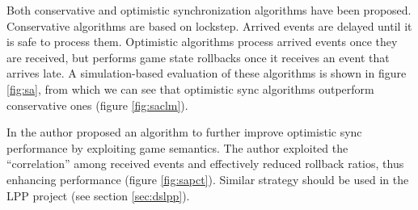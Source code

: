 \documentclass{article}
\begin{document}
Both conservative and optimistic synchronization algorithms have been proposed. Conservative algorithms are based on lockstep. Arrived events are delayed until it is safe to process them. Optimistic algorithms process arrived events once they are received, but performs game state rollbacks once it receives an event that arrives late. A simulation-based evaluation of these algorithms is shown in figure \ref{fig:sa}, from which we can see that optimistic sync algorithms outperform conservative ones (figure \ref{fig:saclm}). 

In \cite{Ferretti05} the author proposed an algorithm to further improve optimistic sync performance by exploiting game semantics. The author exploited the ``correlation'' among received events and effectively reduced rollback ratios, thus enhancing performance (figure \ref{fig:sapct}). Similar strategy should be used in the LPP project (see section \ref{sec:dslpp}).
\end{document}
